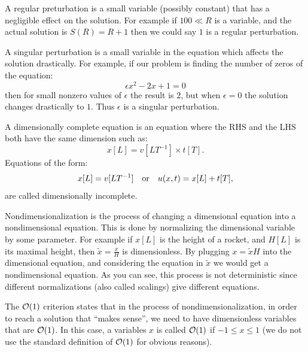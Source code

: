 \documentclass[11pt,a4paper]{article}
\begin{document}
\begin{entry}
  A regular preturbation is a small variable (possibly constant)
  that has a negligible effect on the solution.
  For example if $100 \ll R$ is a variable, and the actual solution
  is $S(R) = R + 1$ then we could say $1$ is a regular perturbation.
\end{entry}

\begin{entry}
  A singular perturbation is a small variable in the equation which
  affects the solution drastically.
  For example, if our problem is finding the number of zeros of the equation:
  \[
    \epsilon x^2 - 2x + 1 = 0
  \]
  then for small nonzero values of $\epsilon$ the result is $2$,
  but when $\epsilon = 0$ the solution changes drastically to $1$.
  Thus $\epsilon$ is a singular perturbation.
\end{entry}

\begin{entry}
  A dimensionally complete equation is an equation where the RHS and the
  LHS both have the same dimension such as:
  \[
    x[L] = v[L T^{-1}] \times t[T].
  \]
  Equations of the form:
  \[
    x[L] = v[L T^{-1}] \quad \text{or} \quad
    u(x,t) = x[L] + t[T],
  \]
  are called dimensionally incomplete.
\end{entry}

\begin{entry}[Nondimensionalization]
  Nondimensionalization is the process of changing a dimensional equation
  into a nondimensional equation.
  This is done by normalizing the dimensional variable by some parameter.
  For example if $x[L]$ is the height of a rocket, and $H[L]$ is its
  maximal height, then $\tilde x = \frac{x}{H}$ is dimensionless.
  By plugging $x = \tilde x H$ into the dimensional equation,
  and considering the equation in $\tilde x$ we would get a nondimensional
  equation.
  As you can see, this process is not deterministic
  since different normalizations (also called scalings) give different
  equations.
\end{entry}

\begin{entry}
  The $\mathcal{O}(1)$ criterion states that
  in the process of nondimensionalization,
  in order to reach a solution that ``makes sense'',
  we need to have dimensionless variables that are $\mathcal{O}(1)$.
  In this case, a variables $x$ is called $\mathcal{O}(1)$ if $-1 \le x \le 1$
  (we do not use the standard definition of $\mathcal{O}(1)$ for obvious reasons).
\end{entry}
\end{document}
